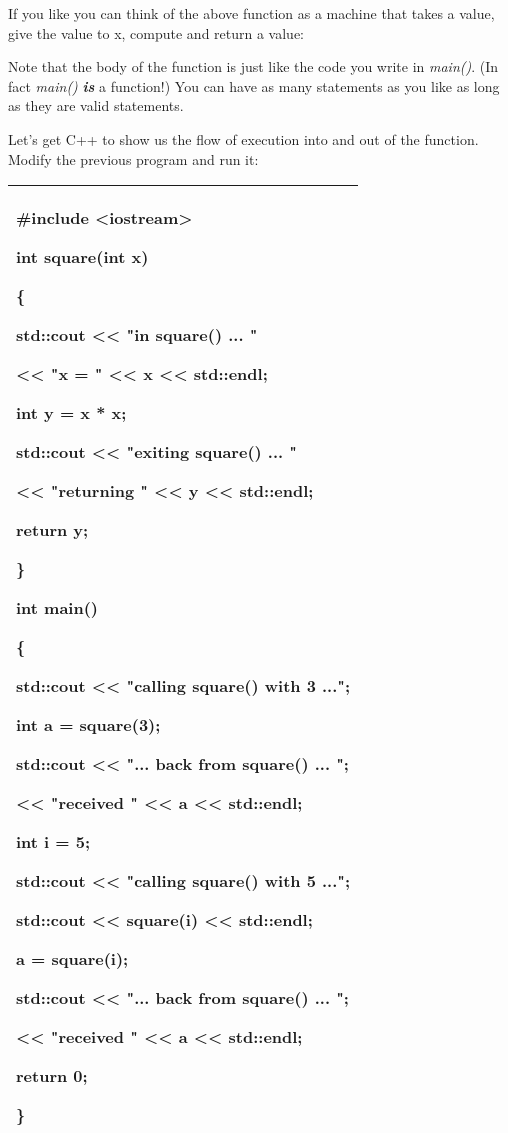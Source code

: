 \documentclass[
]{article}
\begin{document}
If you like you can think of the above function as a machine that takes
a value, give the value to x, compute and return a value:

Note that the body of the function is just like the code you write in
\emph{main()}. (In fact \emph{main()} \emph{\textbf{is}} a function!)
You can have as many statements as you like as long as they are valid
statements.

Let's get C++ to show us the flow of execution into and out of the
function. Modify the previous program and run it:

\begin{longtable}[]{@{}l@{}}
\toprule
\endhead
\begin{minipage}[t]{0.97\columnwidth}\raggedright
\#include \textless iostream\textgreater{}

int square(int x)

\{

std::cout \textless\textless{} "in square() ... "

\textless\textless{} "x = " \textless\textless{} x \textless\textless{}
std::endl;

int y = x * x;

std::cout \textless\textless{} "exiting square() ... "

\textless\textless{} "returning " \textless\textless{} y
\textless\textless{} std::endl;

return y;

\}

int main()

\{

std::cout \textless\textless{} \textbf{"calling square() with 3 ...";}

int a = square(3);

std::cout \textless\textless{} \textbf{"... back from square() ... ";}

\textless\textless{} \textbf{"received " \textless\textless{} }a
\textless\textless{} std::endl;

int i = 5;

std::cout \textless\textless{} \textbf{"calling square() with 5 ...";}

std::cout \textless\textless{} square(i) \textless\textless{} std::endl;

a = square(i);

std::cout \textless\textless{} \textbf{"... back from square() ... ";}

\textless\textless{} \textbf{"received " \textless\textless{} }a
\textless\textless{} std::endl;

return 0;

\}\strut
\end{minipage}\tabularnewline
\bottomrule
\end{longtable}
\end{document}
